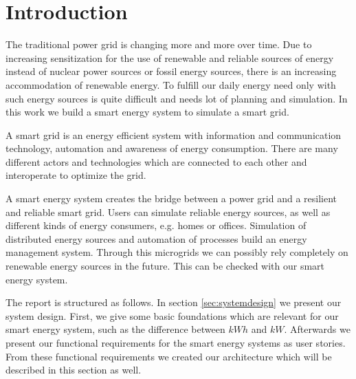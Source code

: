 \section{Introduction}

The traditional power grid is changing more and more over time.
Due to increasing sensitization for the use of renewable and reliable sources of energy instead of nuclear power sources or fossil energy sources, there is an increasing accommodation of renewable energy.
To fulfill our daily energy need only with such energy sources is quite difficult and needs lot of planning and simulation.
In this work we build a smart energy system to simulate a smart grid.

A smart grid is an energy efficient system with information and communication technology, automation and awareness of energy consumption.
There are many different actors and technologies which are connected to each other and interoperate to optimize the grid.

A smart energy system creates the bridge between a power grid and a resilient and reliable smart grid.
Users can simulate reliable energy sources, as well as different kinds of energy consumers, e.g. homes or offices.
Simulation of distributed energy sources and automation of processes build an energy management system.
Through this microgrids we can possibly rely completely on renewable energy sources in the future.
This can be checked with our smart energy system.

The report is structured as follows.
In section \ref{sec:systemdesign} we present our system design.
First, we give some basic foundations which are relevant for our smart energy system, such as the difference between $kWh$ and $kW$.
Afterwards we present our functional requirements for the smart energy systems as user stories.
From these functional requirements we created our architecture which will be described in this section as well.

